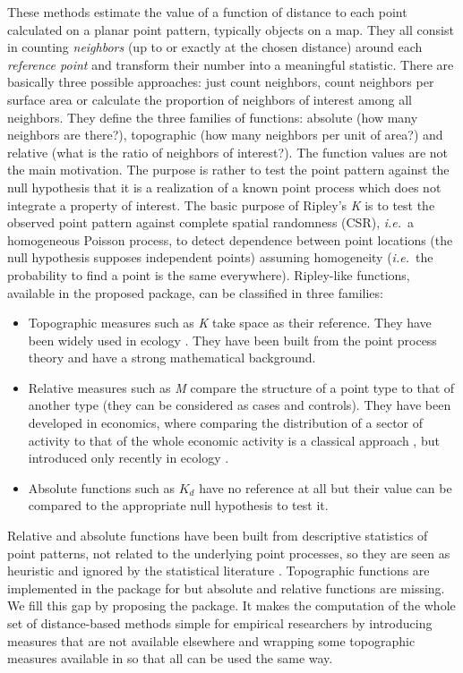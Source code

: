 \documentclass[nojss]{jss}
\begin{document}
These methods estimate the value of a function of distance to each point calculated on a planar point pattern, typically objects on a map. They all consist in counting \emph{neighbors} (up to or exactly at the chosen distance) around each \emph{reference point} and transform their number into a meaningful statistic. There are basically three possible approaches: just count neighbors, count neighbors per surface area or calculate the proportion of neighbors of interest among all neighbors. They define the three families of functions: absolute (how many neighbors are there?), topographic (how many neighbors per unit of area?) and relative (what is the ratio of neighbors of interest?). The function values are not the main motivation. The purpose is rather to test the point pattern against the null hypothesis that it is a realization of a known point process which does not integrate a property of interest. The basic purpose of Ripley's \emph{K} is to test the observed point pattern against complete spatial randomness (CSR), \emph{i.e.}\ a homogeneous Poisson process, to detect dependence between point locations (the null hypothesis supposes independent points) assuming homogeneity (\emph{i.e.}\ the probability to find a point is the same everywhere). Ripley-like functions, available in the proposed  package, can be classified in three families:
\begin{itemize}
\item Topographic measures such as \emph{K} take space as their reference. They have been widely used in ecology \citep{Fortin2005}. They have been built from the point process theory and have a strong mathematical background.
\item Relative measures such as \emph{M} \citep{Marcon2010} compare the structure of a point type to that of another type (they can be considered as cases and controls). They have been developed in economics, where comparing the distribution of a sector of activity to that of the whole economic activity is a classical approach \citep{Combes2008}, but introduced only recently in ecology \citep{Marcon2012b}.
\item Absolute functions such as $K_d$ \citep{Duranton2005} have no reference at all but their value can be compared to the appropriate null hypothesis to test it.
\end{itemize}

Relative and absolute functions have been built from descriptive statistics of point patterns, not related to the underlying point processes, so they are seen as heuristic and ignored by the statistical literature \citep{Illian2008}. Topographic functions are implemented in the  package \citep{Baddeley2005} for  \citep{R2012} but absolute and relative functions are missing. We fill this gap by proposing the  package. It makes the computation of the whole set of distance-based methods simple for empirical researchers by introducing measures that are not available elsewhere and wrapping some topographic measures available in  so that all can be used the same way.
\end{document}
